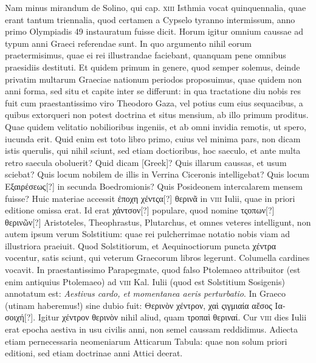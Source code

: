 Nam minus mirandum de Solino, qui cap. \textsc{xiii}
 Isthmia vocat
quinquennalia, quae erant tantum triennalia, quod certamen a Cypselo
tyranno intermissum, anno primo Olympiadis 49 instauratum
fuisse dicit.
Horum igitur omnium caussae ad typum anni Graeci referendae
sunt.
In quo argumento nihil eorum praetermisimus, quae
ei rei illustrandae faciebant, quanquam pene omnibus praesidiis
destituti.
Et quidem primum in genere, quod semper solemus, deinde
privatim multarum Graeciae nationum periodos proposuimus,
quae quidem non anni forma, sed situ et capite inter se differunt: in
qua tractatione diu nobis res fuit cum praestantissimo viro Theodoro
Gaza, vel potius cum eius sequacibus, a quibus extorqueri non
potest doctrina et situs mensium, ab illo primum proditus. 
Quae quidem
velitatio nobilioribus ingeniis, et ab omni invidia remotis, ut
spero, iucunda erit.
Quid enim est toto libro primo, cuius vel minima
pars, non dicam istis querulis, qui nihil sciunt, sed etiam doctioribus,
hoc saeculo, et ante multa retro saecula oboluerit?
Quid dicam \textgreek{[Greek]}?
Quis illarum caussas, et usum sciebat?
Quis
locum nobilem de illis in Verrina Ciceronis intelligebat?
Quis locum
\textgreek{Εξαιρέσεως[?]} in secunda Boedromionis?
Quis Posideonem intercalarem
mensem fuisse?
Huic materiae accessit \textgreek{ἐποχη χέντςα[?] θερινᾶ}
in \textsc{viii} Iulii, quae in priori editione omissa erat.
Id erat \textgreek{χάντσον[?]}
populare, quod nomine \textgreek{τςοπων[?] θερινῶν[?]}
 Aristoteles, Theophrastus,
Plutarchus, et omnes veteres intelligunt, non autem ipsum verum
Solstitium: quae rei pulcherrimae notatio nobis viam ad illustriora
praeiuit.
Quod Solstitiorum, et Aequinoctiorum puncta \textgreek{χέντρα} vocentur,
satis sciunt, qui veterum Graecorum libros legerunt.
Columella
cardines vocavit.
In praestantissimo Parapegmate, quod falso
Ptolemaeo attribuitor (est enim antiquius Ptolemaeo) ad \textsc{viii} Kal.
Iulii (quod est Solstitium Sosigenis) annotatum est: \textit{Aestivus cardo,
et momentanea aeris perturbatio}.
In Graeco (utinam haberemus!)
sine dubio fuit: \textgreek{Θερινὸν χέντρον, χαὶ ςιγμιαία αἔσος Ιασοιχή[?]}.
Igitur \textgreek{χέντρον
θερινὸν} nihil aliud, quam \textgreek{τροπαὶ θεριναί}.
Cur \textsc{viii} dies Iulii erat
epocha aestiva in usu civilis anni, non semel caussam reddidimus. 
Adiecta etiam pernecessaria neomeniarum Atticarum Tabula: quae
non solum priori editioni, sed etiam doctrinae anni Attici deerat.

